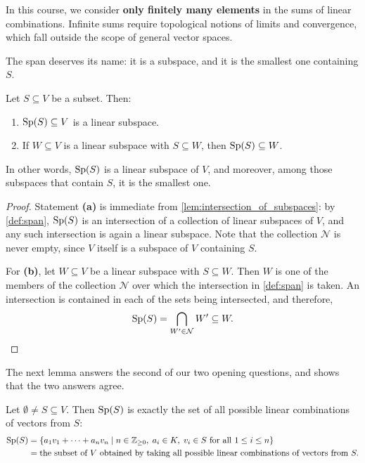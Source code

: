 \begin{importantremark}
\label{rem:finite_sums_only}
In this course, we consider \textbf{only finitely many elements} in the sums of linear combinations. Infinite sums require topological notions of limits and convergence, which fall outside the scope of general vector spaces.
\end{importantremark}

The span deserves its name: it is a subspace, and it is the smallest one containing $S$.

\begin{lemma}
\label{lem:span_is_smallest}
Let $S \subseteq V$ be a subset. Then:
\begin{enumerate}[label=\textbf{(\alph*)}]
    \item $\operatorname{Sp}(S) \subseteq V$ is a linear subspace.
    \item If $W \subseteq V$ is a linear subspace with $S \subseteq W$, then $\operatorname{Sp}(S) \subseteq W$.
\end{enumerate}
In other words, $\operatorname{Sp}(S)$ is a linear subspace of $V$, and moreover, among those subspaces that contain $S$, it is the smallest one.
\end{lemma}

\begin{proof}
Statement \textbf{(a)} is immediate from \cref{lem:intersection_of_subspaces}: by \cref{def:span}, $\operatorname{Sp}(S)$ is an intersection of a collection of linear subspaces of $V$, and any such intersection is again a linear subspace. Note that the collection $\mathcal{N}$ is never empty, since $V$ itself is a subspace of $V$ containing $S$.

For \textbf{(b)}, let $W \subseteq V$ be a linear subspace with $S \subseteq W$. Then $W$ is one of the members of the collection $\mathcal{N}$ over which the intersection in \cref{def:span} is taken. An intersection is contained in each of the sets being intersected, and therefore,
\[
\operatorname{Sp}(S) = \bigcap_{W' \in \mathcal{N}} W' \subseteq W. \qedhere
\]
\end{proof}

The next lemma answers the second of our two opening questions, and shows that the two answers agree.

\begin{lemma}
\label{lem:span_is_linear_combinations}
Let $\emptyset \ne S \subseteq V$. Then $\operatorname{Sp}(S)$ is exactly the set of all possible linear combinations of vectors from $S$:
\begin{align*}
\operatorname{Sp}(S) &= \{a_1 v_1 + \dots + a_n v_n \mid n \in \mathbb{Z}_{\ge 0}, \; a_i \in K, \; v_i \in S \text{ for all } 1 \le i \le n\} \\
&= \text{the subset of } V \text{ obtained by taking all possible linear combinations of vectors from } S.
\end{align*}
\end{lemma}

